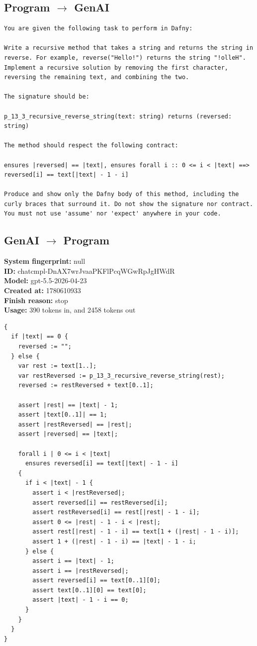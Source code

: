\documentclass{article}
\begin{document}
\subsection*{Program $\rightarrow$ GenAI}
\begin{lstlisting}
You are given the following task to perform in Dafny:

Write a recursive method that takes a string and returns the string in reverse. For example, reverse("Hello!") returns the string "!olleH". Implement a recursive solution by removing the first character, reversing the remaining text, and combining the two.

The signature should be:

p_13_3_recursive_reverse_string(text: string) returns (reversed: string)

The method should respect the following contract:

ensures |reversed| == |text|, ensures forall i :: 0 <= i < |text| ==> reversed[i] == text[|text| - 1 - i]

Produce and show only the Dafny body of this method, including the curly braces that surround it. Do not show the signature nor contract. You must not use 'assume' nor 'expect' anywhere in your code.
\end{lstlisting}
\subsection*{GenAI $\rightarrow$ Program}
\textbf{System fingerprint: }null
\\\textbf{ID: }chatcmpl-DnAX7wrJvaaPKFlPcqWGwRpJgHWdR
\\\textbf{Model: }gpt-5.5-2026-04-23
\\\textbf{Created at: }1780610933
\\\textbf{Finish reason: }stop
\\\textbf{Usage: }390 tokens in, and 2458 tokens out
\begin{lstlisting}
{
  if |text| == 0 {
    reversed := "";
  } else {
    var rest := text[1..];
    var restReversed := p_13_3_recursive_reverse_string(rest);
    reversed := restReversed + text[0..1];

    assert |rest| == |text| - 1;
    assert |text[0..1]| == 1;
    assert |restReversed| == |rest|;
    assert |reversed| == |text|;

    forall i | 0 <= i < |text|
      ensures reversed[i] == text[|text| - 1 - i]
    {
      if i < |text| - 1 {
        assert i < |restReversed|;
        assert reversed[i] == restReversed[i];
        assert restReversed[i] == rest[|rest| - 1 - i];
        assert 0 <= |rest| - 1 - i < |rest|;
        assert rest[|rest| - 1 - i] == text[1 + (|rest| - 1 - i)];
        assert 1 + (|rest| - 1 - i) == |text| - 1 - i;
      } else {
        assert i == |text| - 1;
        assert i == |restReversed|;
        assert reversed[i] == text[0..1][0];
        assert text[0..1][0] == text[0];
        assert |text| - 1 - i == 0;
      }
    }
  }
}
\end{lstlisting}
\end{document}
